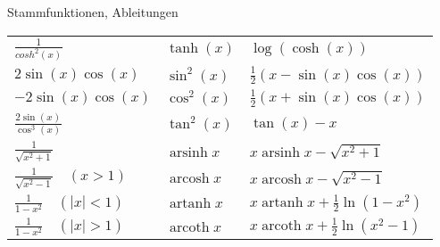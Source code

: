 \begin{Rechenregeln}{Stammfunktionen, Ableitungen}{}
\begin{longtable}{l|l|l}
        $\frac{1}{cosh^2(x)}$ & $\tanh(x)$ & $\log(\cosh(x))$\\[1em]
        $2 \sin(x)\cos(x)$ & $\sin^2(x)$ & $\frac{1}{2}(x-\sin(x)\cos(x))$ \\[.5em]
        $-2\sin(x)\cos(x)$ & $\cos^2(x)$ & $\frac{1}{2}(x+\sin(x)\cos(x))$ \\[.5em]
        $\frac{2 \sin(x)}{\cos^3(x)}$ & $\tan^2(x)$ & $\tan(x) - x$\\[.5em]
        \(\frac{1}{\sqrt {x^2+1}}\)& \(\operatorname{arsinh} x\) & \(x \operatorname{arsinh} x -\sqrt{x^2+1}\)\\
        \(\frac{1}{\sqrt {x^2-1}} \quad (x>1)\)&\(\operatorname{arcosh} x\) & \(x \operatorname{arcosh} x -\sqrt{x^2-1}\)\\
        \(\frac{1}{1-x^2} \quad (\left| x \right|<1)\)&\(\operatorname{artanh} x\) & \(x \operatorname{artanh} x +\frac{1}{2}\ln{\left(1-x^2\right)}\)\\
        \(\frac{1}{1-x^2} \quad (\left| x \right|>1)\)&\(\operatorname{arcoth} x\) & \(x \operatorname{arcoth} x +\frac{1}{2}\ln{\left(x^2-1\right)}\)\\ 
    \end{longtable}
\end{Rechenregeln}

